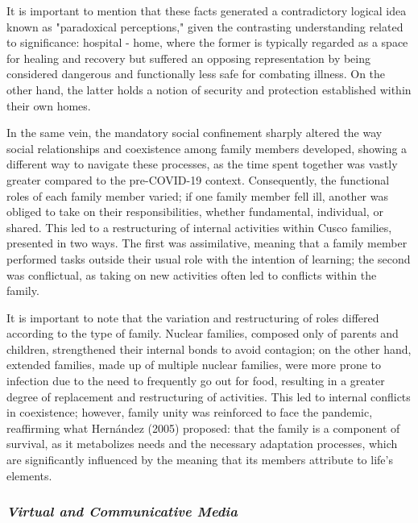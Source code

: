 \documentclass{article}
\begin{document}
It is important to mention that these facts generated a contradictory logical idea known as "paradoxical perceptions," given the contrasting understanding related to significance: hospital - home, where the former is typically regarded as a space for healing and recovery but suffered an opposing representation by being considered dangerous and functionally less safe for combating illness. On the other hand, the latter holds a notion of security and protection established within their own homes.

In the same vein, the mandatory social confinement sharply altered the way social relationships and coexistence among family members developed, showing a different way to navigate these processes, as the time spent together was vastly greater compared to the pre-COVID-19 context. Consequently, the functional roles of each family member varied; if one family member fell ill, another was obliged to take on their responsibilities, whether fundamental, individual, or shared. This led to a restructuring of internal activities within Cusco families, presented in two ways. The first was assimilative, meaning that a family member performed tasks outside their usual role with the intention of learning; the second was conflictual, as taking on new activities often led to conflicts within the family.

It is important to note that the variation and restructuring of roles differed according to the type of family. Nuclear families, composed only of parents and children, strengthened their internal bonds to avoid contagion; on the other hand, extended families, made up of multiple nuclear families, were more prone to infection due to the need to frequently go out for food, resulting in a greater degree of replacement and restructuring of activities. This led to internal conflicts in coexistence; however, family unity was reinforced to face the pandemic, reaffirming what Hernández (2005) proposed: that the family is a component of survival, as it metabolizes needs and the necessary adaptation processes, which are significantly influenced by the meaning that its members attribute to life's elements.

\subsubsection{\textit{Virtual and Communicative Media}}
\end{document}
